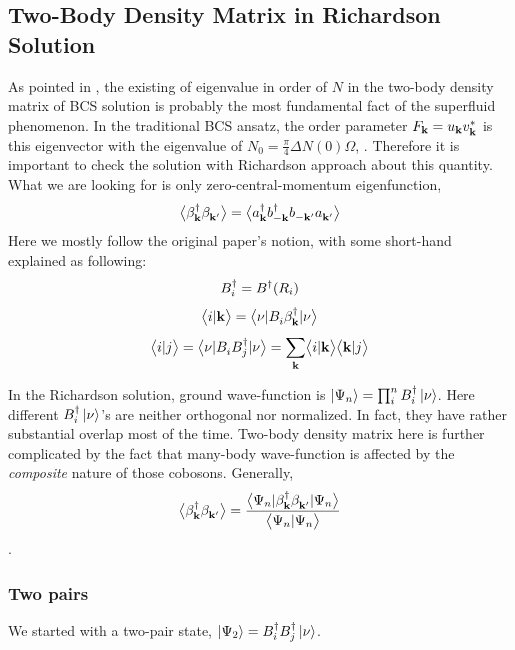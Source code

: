\subsection{Two-Body Density Matrix in Richardson Solution}
As pointed in \cite{Leggett}, the existing of eigenvalue in order of $N$ in the two-body density matrix of BCS solution is probably the most fundamental fact of the superfluid phenomenon.  In the traditional BCS ansatz, the order parameter $F_\vk=u_\vk v^*_\vk$ is this eigenvector with the eigenvalue of $N_0=\frac{\pi}4\Delta{}N(0)\Omega$, \cite[(5.4.32)]{Leggett}.  Therefore it is important to check the solution with Richardson approach \cite{CobosonBcsRich} about this quantity.  What we are looking for is only zero-central-momentum eigenfunction, 
\begin{equation}\label{eq:2bodyDensityMatrixDef}
\av{\beta_\vk^\dg\beta_{\vk'}^{}}=\av{a_\vk^\dg{}b_{-\vk}^\dg{}b_{-\vk'}^{}{}a_{\vk'}^{}}
\end{equation}
Here we mostly follow the original paper's notion, with some short-hand explained as following:
\begin{equation}
 B^\dg_i=B^\dg(R_i)
\end{equation}
\begin{equation}
 \avt{i}{\vk}=\avv{B_i^{}\beta^\dg_\vk}
\end{equation}
\begin{equation}
 \avt{i}{j}=\avv{B_i^{}B^\dg_j}=\sum_\vk \avt{i}{\vk} \avt{\vk}{j}
\end{equation}

In the Richardson solution, ground wave-function is $\ket{\Psi_n}=\prod_i^n{}B^\dg_i\ket{\nu}$. Here different $B^\dg_i\ket{\nu}$'s are neither orthogonal nor normalized. In fact, they have rather substantial overlap most of the time.   Two-body density matrix here is further complicated by the fact that many-body wave-function is affected by the \emph{composite} nature of those cobosons. Generally,  
\begin{equation}
\av{\beta_\vk^\dg\beta_{\vk'}^{}}=\frac{\avv[\Psi_n]{\beta_\vk^\dg\beta_{\vk'}^{}}}{\avt{\Psi_n}{\Psi_n}}
\end{equation}.   

\subsubsection{Two pairs}
We started with a two-pair state, $\ket{\Psi_2}=B^\dg_i{}B^\dg_j\ket{\nu}$. 

